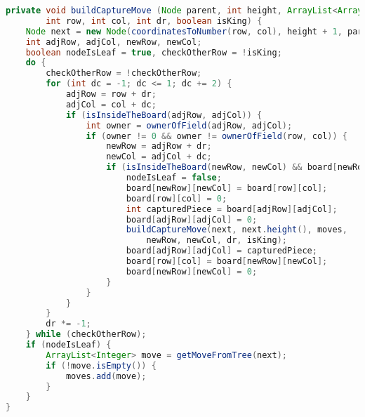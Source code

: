 \begin{footnotesize}
\begin{lstlisting}[language=Java, frame=lines, numberstyle=\tiny, stepnumber=5, caption=Metoda w klasie State budująca drzewo możliwych bić, firstnumber=1]
private void buildCaptureMove (Node parent, int height, ArrayList<ArrayList<Integer>> moves,
        int row, int col, int dr, boolean isKing) {
    Node next = new Node(coordinatesToNumber(row, col), height + 1, parent);
    int adjRow, adjCol, newRow, newCol;
    boolean nodeIsLeaf = true, checkOtherRow = !isKing;
    do {
        checkOtherRow = !checkOtherRow;
        for (int dc = -1; dc <= 1; dc += 2) {
            adjRow = row + dr;
            adjCol = col + dc;
            if (isInsideTheBoard(adjRow, adjCol)) {
                int owner = ownerOfField(adjRow, adjCol);
                if (owner != 0 && owner != ownerOfField(row, col)) {
                    newRow = adjRow + dr;
                    newCol = adjCol + dc;
                    if (isInsideTheBoard(newRow, newCol) && board[newRow][newCol] == 0) {
                        nodeIsLeaf = false;
                        board[newRow][newCol] = board[row][col];
                        board[row][col] = 0;
                        int capturedPiece = board[adjRow][adjCol];
                        board[adjRow][adjCol] = 0;
                        buildCaptureMove(next, next.height(), moves,
                            newRow, newCol, dr, isKing);
                        board[adjRow][adjCol] = capturedPiece;
                        board[row][col] = board[newRow][newCol];
                        board[newRow][newCol] = 0;
                    }
                }
            }
        }
        dr *= -1;
    } while (checkOtherRow);
    if (nodeIsLeaf) {
        ArrayList<Integer> move = getMoveFromTree(next);
        if (!move.isEmpty()) {
            moves.add(move);
        }
    }
}
\end{lstlisting} 
\end{footnotesize}
